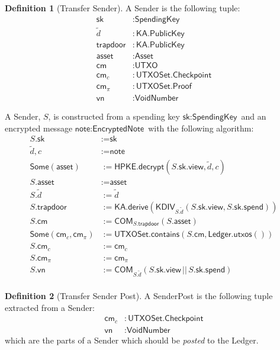 \documentclass[a4paper]{article}
\theoremstyle{definition}
\newtheorem{definition}{Definition}[subsection]
\newcommand{\Asset}{{\textsf{Asset}}}
\newcommand{\COM}{{\textsf{COM}}}
\newcommand{\Checkpoint}{{\textsf{Checkpoint}}}
\newcommand{\EncryptedNote}{{\textsf{EncryptedNote}}}
\newcommand{\HPKE}{{\textsf{HPKE}}}
\newcommand{\KA}{{\textsf{KA}}}
\newcommand{\KDIV}{{\textsf{KDIV}}}
\newcommand{\Ledger}{{\textsf{Ledger}}}
\newcommand{\Proof}{{\textsf{Proof}}}
\newcommand{\PublicKey}{{\textsf{PublicKey}}}
\newcommand{\SenderPost}{{\textsf{SenderPost}}}
\newcommand{\Sender}{{\textsf{Sender}}}
\newcommand{\Some}{{\textsf{Some}}}
\newcommand{\SpendingKey}{{\textsf{SpendingKey}}}
\newcommand{\Transfer}{{\textsf{Transfer}}}
\newcommand{\UTXOSet}{{\textsf{UTXOSet}}}
\newcommand{\UTXO}{{\textsf{UTXO}}}
\newcommand{\VoidNumber}{{\textsf{VoidNumber}}}
\newcommand{\asset}{{\textsf{asset}}}
\newcommand{\cm}{{\textsf{cm}}}
\newcommand{\contains}{{\textsf{contains}}}
\newcommand{\decrypt}{{\textsf{decrypt}}}
\newcommand{\derive}{{\textsf{derive}}}
\newcommand{\note}{{\textsf{note}}}
\newcommand{\sk}{{\textsf{sk}}}
\newcommand{\spend}{{\textsf{spend}}}
\newcommand{\trapdoor}{{\textsf{trapdoor}}}
\newcommand{\utxos}{{\textsf{utxos}}}
\newcommand{\view}{{\textsf{view}}}
\newcommand{\vn}{{\textsf{vn}}}
\begin{document}
\begin{definition}[\Transfer{} Sender]
    A \Sender{} is the following tuple:
    \begin{align*}
        \sk       &: \SpendingKey \\
        \tilde{d} &: \KA.\PublicKey \\
        \trapdoor &: \KA.\PublicKey \\
        \asset    &: \Asset \\
        \cm       &: \UTXO \\
        \cm_c     &: \UTXOSet.\Checkpoint \\
        \cm_\pi   &: \UTXOSet.\Proof \\
        \vn       &: \VoidNumber
    \end{align*}

    A \Sender{}, $S$, is constructed from a spending key $\sk : \SpendingKey$ and an encrypted message $\note : \EncryptedNote$ with the following algorithm:
    \begin{align*}
        S.\sk                 &:= \sk \\
        \tilde{d}, c          &:= \note \\
        \Some(\asset)         &:= \HPKE.\decrypt(S.\sk.\view, \tilde{d}, c) \\
        S.\asset              &:= \asset \\
        S.\tilde{d}           &:= \tilde{d} \\
        S.\trapdoor           &:= \KA.\derive(\KDIV_{S.\tilde{d}}(S.\sk.\view, S.\sk.\spend)) \\
        S.\cm                 &:= \COM_{S.\trapdoor}(S.\asset) \\
        \Some(\cm_c, \cm_\pi) &:= \UTXOSet.\contains(S.\cm, \Ledger.\utxos()) \\
        S.\cm_c               &:= \cm_c \\
        S.\cm_\pi             &:= \cm_\pi \\
        S.\vn                 &:= \COM_{S.\tilde{d}}(S.\sk.\view \,||\, S.\sk.\spend) \\
    \end{align*}
\end{definition}

\begin{definition}[\Transfer{} Sender Post]
    A \SenderPost{} is the following tuple extracted from a \Sender{}:
    \begin{align*}
        \cm_c &: \UTXOSet.\Checkpoint \\
        \vn   &: \VoidNumber
    \end{align*}
    which are the parts of a \Sender{} which should be \emph{posted} to the \Ledger{}.
\end{definition}
\end{document}
